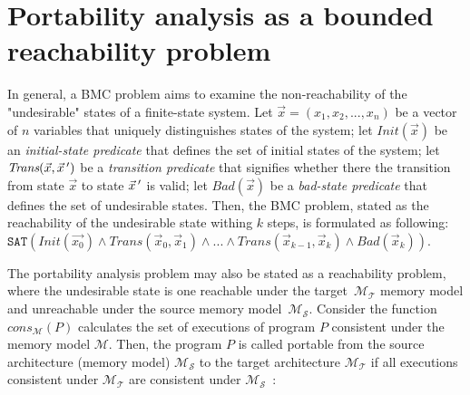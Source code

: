 

\section{Portability analysis as a bounded reachability problem}
\label{ch:enc:bmc}


In general, a BMC problem aims to examine the non-reachability of the "undesirable" states of a finite-state system.
Let $\vec{x} = (x_1, x_2, ..., x_n)$ be a vector of $n$ variables that uniquely distinguishes states of the system; let $\textit{Init}(\vec{x})$ be an \textit{initial-state predicate} that defines the set of initial states of the system; let $\textit{Trans}(\vec{x}, \vec{x}\,')$ be a \textit{transition predicate} that signifies whether there the transition from state $\vec{x}$ to state $\vec{x}\,'$ is valid; let $\textit{Bad}(\vec{x})$ be a \textit{bad-state predicate} that defines the set of undesirable states.
Then, the BMC problem, stated as the reachability of the undesirable state withing $k$ steps, is formulated as following:
$\texttt{SAT}( \textit{Init}(\vec{x_0}) \land \textit{Trans}(\vec{x}_0, \vec{x}_1) \land ... \land \textit{Trans}(\vec{x}_{k-1}, \vec{x}_k) \land \textit{Bad}(\vec{x}_k) )$.

The portability analysis problem may also be stated as a reachability problem, where the undesirable state is one reachable under the target~$\mathcal{M_T}$ memory model and unreachable under the source memory model~$\mathcal{M_S}$.
Consider the function $\textit{cons}_{\mathcal{M}}(P)$ calculates the set of executions of program $P$ consistent under the memory model $\mathcal{M}$. Then, the program $P$ is called portable from the source architecture (memory model) $\mathcal{M_S}$ to the target architecture $\mathcal{M_T}$ if all executions consistent under $\mathcal{M_T}$ are consistent under $\mathcal{M_S}$~\cite{Porthos17a}:

